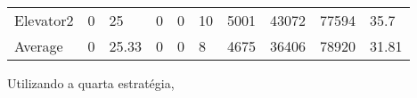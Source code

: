 ﻿\documentclass[a4paper]{article}
\begin{document}
\begin{table}[h]
\begin{tabular}{@{}llllllllll@{}}
Elevator2 & 0        & 25            & 0           & 0                                                               & 10                                                                  & 5001                                                         & 43072                                                 & 77594                                                   & 35.7         \\
Average   & 0     & 25.33         & 0        & 0                                                               & 8                                                               & 4675                                                         & 36406                                                 & 78920                                                   & 31.81          \\ \bottomrule
\end{tabular}
\end{table}

Utilizando a quarta estratégia,
\end{document}
